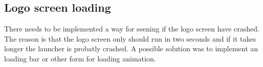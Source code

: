\subsection{Logo screen loading}
\label{backlog:logo_screen_loading}

There needs to be implemented a way for seening if the logo screen have crashed. The reason is that the logo screen only should run in two seconds and if it takes longer the launcher is probatly crashed. A possible solution was to implement an loading bar or other form for loading animation.